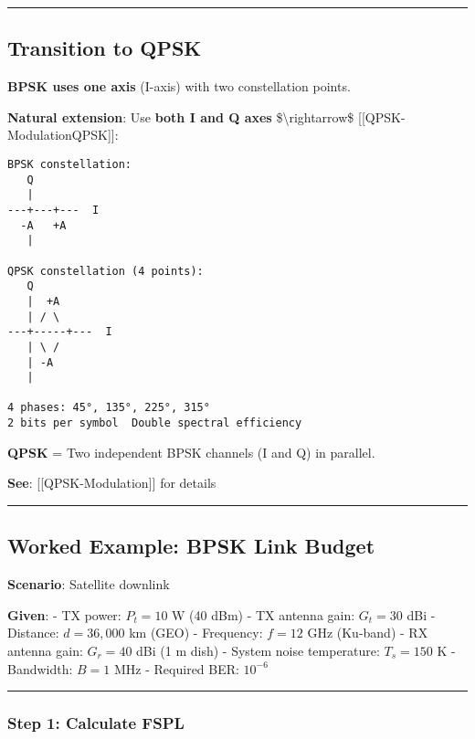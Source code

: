 \begin{center}\rule{0.5\linewidth}{0.5pt}\end{center}

\subsection{Transition to QPSK}\label{transition-to-qpsk}

\textbf{BPSK uses one axis} (I-axis) with two constellation points.

\textbf{Natural extension}: Use \textbf{both I and Q axes}
\$\textbackslash rightarrow\$ {[}{[}QPSK-Modulation\textbar QPSK{]}{]}:

\begin{verbatim}
BPSK constellation:
   Q
   |
---+---+---  I
  -A   +A
   |

QPSK constellation (4 points):
   Q
   |  +A
   | / \
---+-----+---  I
   | \ /
   | -A
   |

4 phases: 45°, 135°, 225°, 315°
2 bits per symbol  Double spectral efficiency
\end{verbatim}

\textbf{QPSK} = Two independent BPSK channels (I and Q) in parallel.

\textbf{See}: {[}{[}QPSK-Modulation{]}{]} for details

\begin{center}\rule{0.5\linewidth}{0.5pt}\end{center}

\subsection{Worked Example: BPSK Link
Budget}\label{worked-example-bpsk-link-budget}

\textbf{Scenario}: Satellite downlink

\textbf{Given}: - TX power: \(P_t = 10\) W (40 dBm) - TX antenna gain:
\(G_t = 30\) dBi - Distance: \(d = 36,000\) km (GEO) - Frequency:
\(f = 12\) GHz (Ku-band) - RX antenna gain: \(G_r = 40\) dBi (1 m dish)
- System noise temperature: \(T_s = 150\) K - Bandwidth: \(B = 1\) MHz -
Required BER: \(10^{-6}\)

\begin{center}\rule{0.5\linewidth}{0.5pt}\end{center}

\subsubsection{Step 1: Calculate FSPL}\label{step-1-calculate-fspl}

